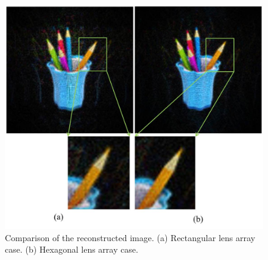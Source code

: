 \documentclass[10pt,letterpaper]{article}
\begin{document}
\begin{figure}[htb]
\centering\includegraphics[width=.5\columnwidth]{fig_11}
\caption{Comparison of the reconstructed image. (a) Rectangular lens array case. (b) Hexagonal lens array case.}
\label{fig_11}
\end{figure}
\end{document}
